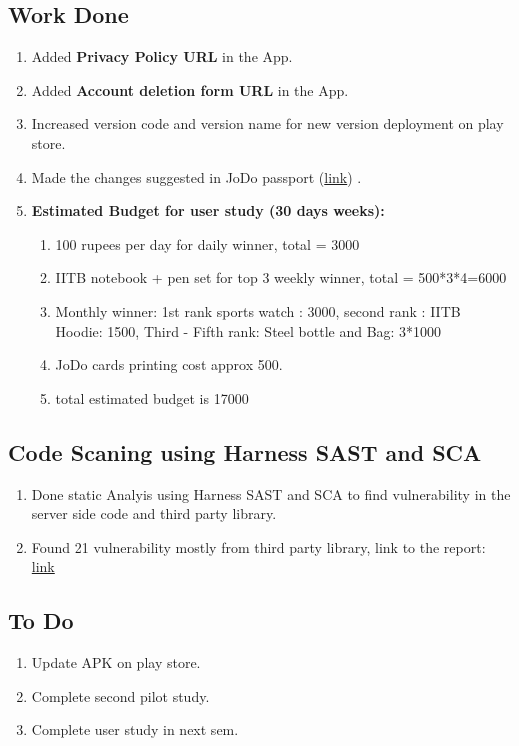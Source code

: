 \documentclass[12pt]{article}
\begin{document}
\subsection{Work Done}
\begin{enumerate}
    \item Added \textbf{Privacy Policy URL} in the App.
    \item Added \textbf{Account deletion form URL} in the App.
    \item Increased version code and version name for new version deployment on play store.
    \item Made the changes suggested in JoDo passport (\href{https://canva.link/x8w50ao7f9vl1xl}{link}) .
    \item \textbf{Estimated Budget for user study (30 days weeks):}
    \begin{enumerate}
        \item 100 rupees per day for daily winner, total = 3000
        \item IITB notebook + pen set for top 3 weekly winner, total = 500*3*4=6000
        \item Monthly winner: 1st rank sports watch : 3000, second rank : IITB Hoodie: 1500, Third - Fifth rank: Steel bottle and Bag: 3*1000
        \item JoDo cards printing cost approx 500. 
        \item total estimated budget is 17000
    \end{enumerate}
\end{enumerate}

\subsection{Code Scaning using Harness SAST and SCA}
\begin{enumerate}
    \item Done static Analyis using Harness SAST and SCA to find vulnerability in the server side code and third party library.
    \item Found 21 vulnerability mostly from third party library, link to the report: \href{https://drive.google.com/file/d/1HfIV1nEnnZx0QsAe7Flo7K23HKdTCwdX/view?usp=sharing}{link}
\end{enumerate}

\subsection{To Do}
\begin{enumerate}
    \item Update APK on play store.
    \item Complete second pilot study.
    \item Complete user study in next sem.
\end{enumerate}
\end{document}

